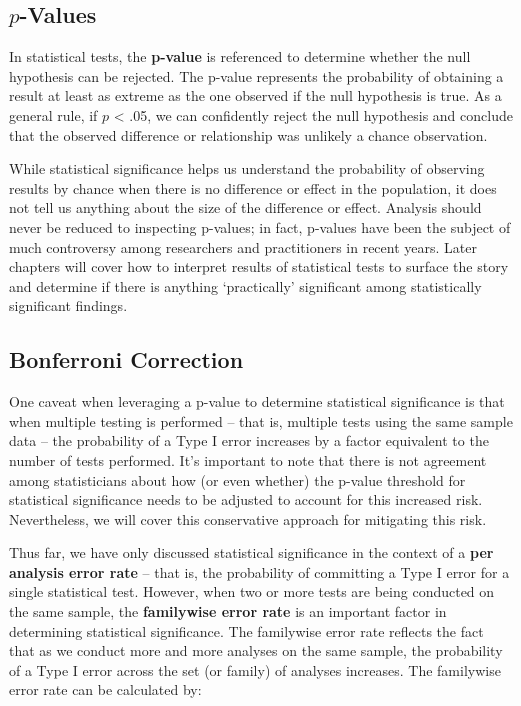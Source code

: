 \documentclass[
]{book}
\begin{document}
\hypertarget{p-values}{%
\subsection{\texorpdfstring{\(p\)-Values}{p-Values}}\label{p-values}}

In statistical tests, the \textbf{p-value} is referenced to determine whether the null hypothesis can be rejected. The p-value represents the probability of obtaining a result at least as extreme as the one observed if the null hypothesis is true. As a general rule, if \(p\) \textless{} .05, we can confidently reject the null hypothesis and conclude that the observed difference or relationship was unlikely a chance observation.

While statistical significance helps us understand the probability of observing results by chance when there is no difference or effect in the population, it does not tell us anything about the size of the difference or effect. Analysis should never be reduced to inspecting p-values; in fact, p-values have been the subject of much controversy among researchers and practitioners in recent years. Later chapters will cover how to interpret results of statistical tests to surface the story and determine if there is anything `practically' significant among statistically significant findings.

\hypertarget{bonferroni-correction}{%
\subsection{Bonferroni Correction}\label{bonferroni-correction}}

One caveat when leveraging a p-value to determine statistical significance is that when multiple testing is performed -- that is, multiple tests using the same sample data -- the probability of a Type I error increases by a factor equivalent to the number of tests performed. It's important to note that there is not agreement among statisticians about how (or even whether) the p-value threshold for statistical significance needs to be adjusted to account for this increased risk. Nevertheless, we will cover this conservative approach for mitigating this risk.

Thus far, we have only discussed statistical significance in the context of a \textbf{per analysis error rate} -- that is, the probability of committing a Type I error for a single statistical test. However, when two or more tests are being conducted on the same sample, the \textbf{familywise error rate} is an important factor in determining statistical significance. The familywise error rate reflects the fact that as we conduct more and more analyses on the same sample, the probability of a Type I error across the set (or family) of analyses increases. The familywise error rate can be calculated by:
\end{document}
